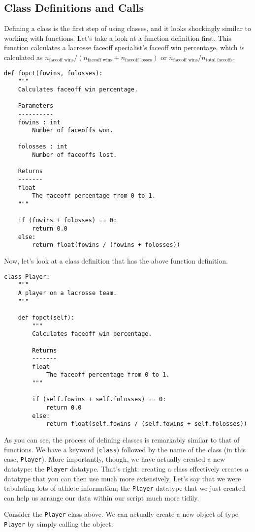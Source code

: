 \subsection{Class Definitions and Calls}
Defining a class is the first step of using classes, and it looks shockingly similar to working with functions. Let's take a look at a function definition first. This function calculates a lacrosse faceoff specialist's faceoff win percentage, which is calculated as $n_\text{faceoff wins} / (n_\text{faceoff wins} + n_\text{faceoff losses})$ or $n_\text{faceoff wins}/n_\text{total faceoffs}$.\par
\begin{lstlisting}[style=pippython]
def fopct(fowins, folosses):
	"""
	Calculates faceoff win percentage.
	
	Parameters
	----------
	fowins : int
		Number of faceoffs won.

	folosses : int
		Number of faceoffs lost.

	Returns
	-------
	float
		The faceoff percentage from 0 to 1.
	"""
	
	if (fowins + folosses) == 0:
		return 0.0
	else:
		return float(fowins / (fowins + folosses))
\end{lstlisting}
Now, let's look at a class definition that has the above function definition.\par
\begin{lstlisting}[style=pippython]
class Player:
	"""
	A player on a lacrosse team.
	"""

	def fopct(self):
		"""
		Calculates faceoff win percentage.
		
		Returns
		-------
		float
			The faceoff percentage from 0 to 1.
		"""
		
		if (self.fowins + self.folosses) == 0:
			return 0.0
		else:
			return float(self.fowins / (self.fowins + self.folosses))
\end{lstlisting}
As you can see, the process of defining classes is remarkably similar to that of functions. We have a keyword (\verb|class|) followed by the name of the class (in this case, \verb|Player|). More importantly, though, we have actually created a new datatype: the \verb|Player| datatype. That's right: creating a class effectively creates a datatype that you can then use much more extensively. Let's say that we were tabulating lots of athlete information; the \verb|Player| datatype that we just created can help us arrange our data within our script much more tidily.\par
Consider the \verb|Player| class above. We can actually create a new object of type \verb|Player| by simply calling the object.\par
